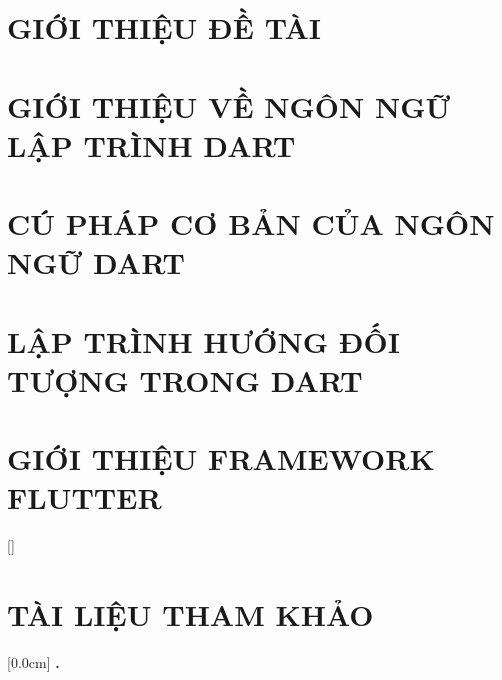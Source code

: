 \documentclass[a4paper,13pt,3p,oneside]{report}
\theoremstyle{definition}
\begin{document}
\chapter{GIỚI THIỆU ĐỀ TÀI}
\label{chapter:Introduction}

\newpage
\chapter{GIỚI THIỆU VỀ NGÔN NGỮ LẬP TRÌNH DART}
\label{chapter:Introduction_Dart_Programming}


\newpage
\chapter{CÚ PHÁP CƠ BẢN CỦA NGÔN NGỮ DART}
\label{chapter:Dart_Syntax}


\newpage
\chapter{LẬP TRÌNH HƯỚNG ĐỐI TƯỢNG TRONG DART}
\label{chapter:Experiment}


\newpage
\chapter{GIỚI THIỆU FRAMEWORK FLUTTER}
\label{chapter:SolutionAndContribution}


\cleardoublepage              %
\null                        
\thispagestyle{empty}        
\newpage                    


[]

\chapter*{TÀI LIỆU THAM KHẢO}
{}


\titlespacing*{\chapter}{0pt}{-20pt}{20pt}

    [0.0cm]             %
    {\bfseries\vspace{0.3cm}}                  %
    {{\bfseries{\scshape} \thecontentslabel.\ }} %
    {}         %
    {\contentspage}         %
\end{document}
